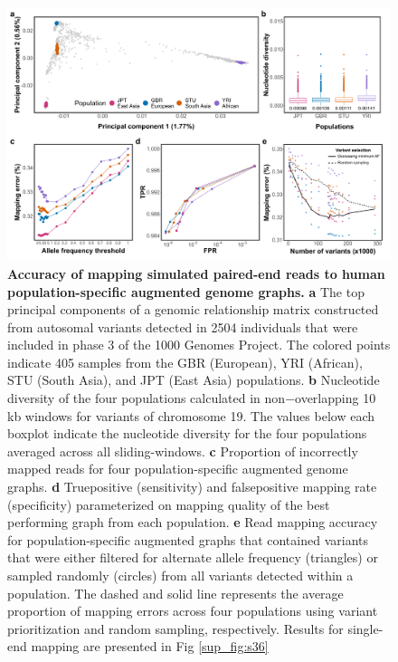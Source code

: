 \documentclass[../main.tex]{subfiles}
\begin{document}
\begin{figure}[!htb]
    \centering
    \includegraphics[width=\textwidth]{paper2/main_figure/Fig3.pdf}
    \caption[Human vs cattle genome graphs]{\textbf{Accuracy of mapping simulated paired-end reads to human population-specific augmented genome graphs.}
    \small{\textbf{a} The top principal components of a genomic relationship matrix constructed from autosomal variants detected in 2504 individuals that were included in phase 3 of the 1000 Genomes Project. The colored points indicate 405 samples from the GBR (European), YRI (African), STU (South Asia), and JPT (East Asia) populations. \textbf{b} Nucleotide diversity of the four populations calculated in non$-$overlapping 10 kb windows for variants of chromosome 19. The values below each boxplot indicate the nucleotide diversity for the four populations averaged across all sliding-windows. \textbf{c} Proportion of incorrectly mapped reads for four population-specific augmented genome graphs. \textbf{d} 
    True\-positive (sensitivity) and false\-positive mapping rate (specificity) parameterized on mapping quality of the best performing graph from each population. \textbf{e} Read mapping accuracy for population-specific augmented graphs that contained variants that were either filtered for alternate allele frequency (triangles) or sampled randomly (circles) from all variants detected within a population. The dashed and solid line represents the average proportion of mapping errors across four populations using variant prioritization and random sampling, respectively. Results for single-end mapping are presented in Fig \ref{sup_fig:s36}}}
    \label{fig33:hum}
\end{figure}
\end{document}
